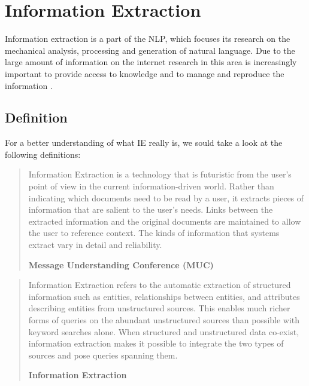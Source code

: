 \section{Information Extraction}
\label{sec:information-extraction}

Information extraction is a part of the \gls{NLP}, which focuses its research on the mechanical analysis, processing and generation of natural language. Due to the large amount of information on the internet research in this area is increasingly important to provide access to knowledge and to manage and reproduce the information \cite{Weinhofer:2010}\cite{Linsmayr:2010}.

\subsection{Definition}
For a better understanding of what \gls{IE} really is, we sould take a look at the following definitions:

\begin{quote}
Information Extraction is a technology that is futuristic from the user's point of view in the current information-driven world. Rather than indicating which documents need to be read by a user, it extracts pieces of information that are salient to the user's needs. Links between the extracted information and the original documents are maintained to allow the user to reference context. The kinds of information that systems extract vary in detail and reliability.

\hfill \textbf{Message Understanding Conference (MUC)}

\hfill \citeauthor{Chinchor:2001} \cite{Chinchor:2001}
\end{quote}

\begin{quote}
Information Extraction refers to the automatic extraction of structured information such as entities, relationships between entities, and attributes describing entities from unstructured sources. This enables much richer forms of queries on the abundant unstructured sources than possible with keyword searches alone. When structured and unstructured data co-exist, information extraction makes it possible to integrate the two types of sources and pose queries spanning them.

\hfill \textbf{Information Extraction}

\hfill \citeauthor{Sarawagi:2008} \cite{Sarawagi:2008}
\end{quote}

